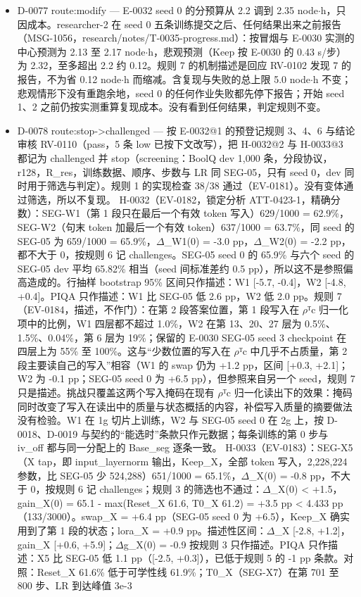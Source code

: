\documentclass[11pt]{article}
\begin{document}
\begin{itemize}
\item D-0077 route:modify --- E-0032 seed 0 的分预算从 2.2 调到 2.35 node\ensuremath{\cdot}h，只因成本。researcher-2 在 seed 0 五条训练提交之后、任何结果出来之前报告（MSG-1056，research/notes/T-0035-progress.md）：按冒烟与 E-0030 实测的中心预测为 2.13 至 2.17 node\ensuremath{\cdot}h，悲观预测（Keep 按 E-0030 的 0.43 s/步）为 2.32，至多超出 2.2 约 0.12。规则 7 的机制描述是回应 RV-0102 发现 7 的报告，不为省 0.12 node\ensuremath{\cdot}h 而缩减。含复现与失败的总上限 5.0 node\ensuremath{\cdot}h 不变；悲观情形下没有重跑余地，seed 0 的任何作业失败都先停下报告；开始 seed 1、2 之前仍按实测重算复现成本。没有看到任何结果，判定规则不变。
\item D-0078 route:stop-\textgreater{}challenged --- 按 E-0032@1 的预登记规则 3、4、6 与结论审核 RV-0110（pass，5 条 low 已按下文改写），把 H-0032@2 与 H-0033@3 都记为 challenged 并 stop（screening：BoolQ dev 1,000 条，分段协议，r128，R\_res，训练数据、顺序、步数与 LR 同 SEG-05，只有 seed 0，dev 同时用于筛选与判定）。规则 1 的实现检查 38/38 通过（EV-0181）。没有变体通过筛选，所以不复现。 H-0032（EV-0182，锁定分析 ATT-0423-1，精确分数）：SEG-W1（第 1 段只在最后一个有效 token 写入）629/1000 = 62.9\%，SEG-W2（句末 token 加最后一个有效 token）637/1000 = 63.7\%，同 seed 的 SEG-05 为 659/1000 = 65.9\%，\ensuremath{\Delta}\_W1(0) = -3.0 pp，\ensuremath{\Delta}\_W2(0) = -2.2 pp，都不大于 0，按规则 6 记 challenges。SEG-05 seed 0 的 65.9\% 与六个 seed 的 SEG-05 dev 平均 65.82\% 相当（seed 间标准差约 0.5 pp），所以这不是参照偏高造成的。行抽样 bootstrap 95\% 区间只作描述：W1 [-5.7, -0.4]，W2 [-4.8, +0.4]。PIQA 只作描述：W1 比 SEG-05 低 2.6 pp，W2 低 2.0 pp。规则 7（EV-0184，描述，不作门）：在第 2 段答案位置，第 1 段写入在 \ensuremath{\rho}ᵀc 归一化项中的比例，W1 四层都不超过 1.0\%，W2 在第 13、20、27 层为 0.5\%、1.5\%、0.04\%，第 6 层为 19\%；保留的 E-0030 SEG-05 seed 3 checkpoint 在四层上为 55\% 至 100\%。这与``少数位置的写入在 \ensuremath{\rho}ᵀc 中几乎不占质量，第 2 段主要读自己的写入''相容（W1 的 swap 仍为 +1.2 pp，区间 [+0.3, +2.1]；W2 为 -0.1 pp；SEG-05 seed 0 为 +6.5 pp），但参照来自另一个 seed，规则 7 只是描述。挑战只覆盖这两个写入掩码在现有 \ensuremath{\rho}ᵀc 归一化读出下的效果：掩码同时改变了写入在读出中的质量与状态概括的内容，补偿写入质量的摘要做法没有检验。W1 在 1g 切片上训练，W2 与 SEG-05 seed 0 在 2g 上，按 D-0018、D-0019 与契约的``能选时''条款只作元数据；每条训练的第 0 步与 iv\_off 都与同一分配上的 Base\_seg 逐条一致。 H-0033（EV-0183）：SEG-X5（X tap，即 input\_layernorm 输出，Keep\_X，全部 token 写入，2,228,224 参数，比 SEG-05 少 524,288）651/1000 = 65.1\%，\ensuremath{\Delta}\_X(0) = -0.8 pp，不大于 0，按规则 6 记 challenges；规则 3 的筛选也不通过：\ensuremath{\Delta}\_X(0) \textless{} +1.5，gain\_X(0) = 65.1 - max(Reset\_X 61.6, T0\_X 61.2) = +3.5 pp \textless{} 4.433 pp（133/3000）。swap\_X = +6.4 pp（SEG-05 seed 0 为 +6.5），Keep\_X 确实用到了第 1 段的状态；lora\_X = +0.9 pp。描述性区间：\ensuremath{\Delta}\_X [-2.8, +1.2]，gain\_X [+0.6, +5.9]；\ensuremath{\Delta}g\_X(0) = -0.9 按规则 3 只作描述。PIQA 只作描述：X5 比 SEG-05 低 1.1 pp（[-2.5, +0.3]），已低于规则 5 的 -1 pp 条款。对照：Reset\_X 61.6\% 低于可学性线 61.9\%；T0\_X（SEG-X7）在第 701 至 800 步、LR 到达峰值 3e-3 
\end{itemize}
\end{document}

